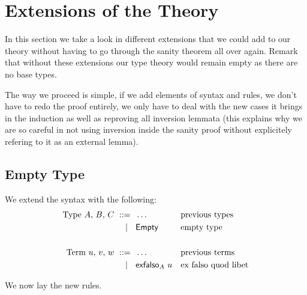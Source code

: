 \section{Extensions of the Theory}
\label{sec:extensions}

In this section we take a look in different extensions that we could add to
our theory without having to go through the sanity theorem all over again.
Remark that without these extensions our type theory would remain empty as there
are no base types.

The way we proceed is simple, if we add elements of syntax and rules, we don't
have to redo the proof entirely, we only have to deal with the new cases it
brings in the induction as well as reproving all inversion lemmata
(this explains why we are so careful in not using inversion inside the sanity
proof without explicitely refering to it as an external lemma).

\subsection{Empty Type}
\label{sec:empty-type}

We extend the syntax with the following:
%
\begin{align*}
  \text{Type $A$, $B$, $C$}
    \ \mathrel{{:}{:}{=}}\    {}& \ldots                   && \text{previous types}\\
    \ \mid\ \  {}& \mathsf{Empty}                   && \text{empty type} \\
  \\
  \text{Term $u$, $v$, $w$}
    \ \mathrel{{:}{:}{=}}\    {}& \ldots                   && \text{previous terms} \\
    \ \mid\ \  {}& \mathsf{exfalso}_{A}\  u         && \text{ex falso quod libet}
\end{align*}

We now lay the new rules.

\newcommand{\rlTyEmpty}{\referTo{ty-empty}{rul:ty-empty}}
\newcommand{\showTyEmpty}{%
  \infer[\rulename{ty-empty}] %
  {\isctx{\G}}
  {\istype{\G}{\Empty}}
}

\newcommand{\rlTermExfalso}{\referTo{term-exfalso}{rul:term-exfalso}}
\newcommand{\showTermExfalso}{%
  \infer[\rulename{term-exfalso}] %
  {\istype{\G}{\A} \\
   \isterm{\G}{\uu}{\Empty}
  }
  {\isterm{\G}{\exfalso{\A} \uu}{\A}}
}

\newcommand{\rlEqTySubstEmpty}{\referTo{eq-ty-subst-empty}{rul:eq-ty-subst-empty}}
\newcommand{\showEqTySubstEmpty}{%
  \infer[\rulename{eq-ty-subst-empty}] %
  {\issubst{\sbs}{\G}{\D}}
  {\eqtype{\G}{\subst{\Empty}{\sbs}}{\Empty}}
}

